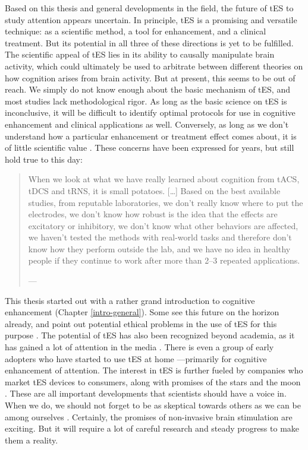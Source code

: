 \documentclass[11pt,]{memoir}
\begin{document}
Based on this thesis and general developments in the field, the future of tES to study attention appears uncertain. In principle, tES is a promising and versatile technique: as a scientific method, a tool for enhancement, and a clinical treatment. But its potential in all three of these directions is yet to be fulfilled. The scientific appeal of tES lies in its ability to causally manipulate brain activity, which could ultimately be used to arbitrate between different theories on how cognition arises from brain activity. But at present, this seems to be out of reach. We simply do not know enough about the basic mechanism of tES, and most studies lack methodological rigor. As long as the basic science on tES is inconclusive, it will be difficult to identify optimal protocols for use in cognitive enhancement and clinical applications as well. Conversely, as long as we don't understand how a particular enhancement or treatment effect comes about, it is of little scientific value \autocite{Duecker2014}. These concerns have been expressed for years, but still hold true to this day:

\begin{quote}
When we look at what we have really learned about cognition from tACS, tDCS and tRNS, it is small potatoes. {[}\ldots{}{]} Based on the best available studies, from reputable laboratories, we don't really know where to put the electrodes, we don't know how robust is the idea that the effects are excitatory or inhibitory, we don't know what other behaviors are affected, we haven't tested the methods with real-world tasks and therefore don't know how they perform outside the lab, and we have no idea in healthy people if they continue to work after more than 2--3 repeated applications.

--- \textcite{Walsh2013}
\end{quote}

This thesis started out with a rather grand introduction to cognitive enhancement (Chapter \ref{intro-general}). Some see this future on the horizon already, and point out potential ethical problems in the use of tES for this purpose \autocite{CohenKadosh2012}. The potential of tES has also been recognized beyond academia, as it has gained a lot of attention in the media \autocite{Dubljevic2014}. There is even a group of early adopters who have started to use tES at home \autocite{Jwa2015}---primarily for cognitive enhancement of attention. The interest in tES is further fueled by companies who market tES devices to consumers, along with promises of the stars and the moon \autocite{Santarnecchi2013b}. These are all important developments that scientists should have a voice in. When we do, we should not forget to be as skeptical towards others as we can be among ourselves \autocites{Riggall2015}{Steenbergen2016}{Walsh2013}{Wurzman2016}. Certainly, the promises of non-invasive brain stimulation are exciting. But it will require a lot of careful research and steady progress to make them a reality.
\end{document}
